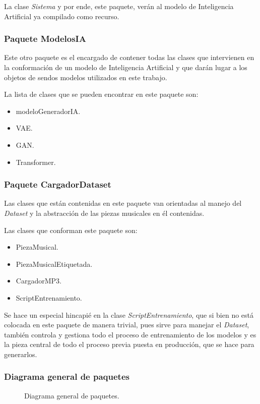 La clase \emph{Sistema} y por ende, este paquete, verán al modelo de Inteligencia Artificial ya compilado como recurso.

\subsubsection{Paquete ModelosIA}

Este otro paquete es el encargado de contener todas las clases que intervienen en la conformación de un modelo de Inteligencia Artificial y que darán lugar a los objetos de sendos modelos utilizados en este trabajo.

La lista de clases que se pueden encontrar en este paquete son:
\begin{itemize}
  \item modeloGeneradorIA.
  \item VAE.
  \item GAN.
  \item Transformer.
\end{itemize}


\subsubsection{Paquete CargadorDataset}

Las clases que están contenidas en este paquete van orientadas al manejo del \emph{Dataset} y la abstracción de las piezas musicales en él contenidas.

Las clases que conforman este paquete son:
\begin{itemize}
  \item PiezaMusical.
  \item PiezaMusicalEtiquetada.
  \item CargadorMP3.
  \item ScriptEntrenamiento.
\end{itemize}

Se hace un especial hincapié en la clase \emph{ScriptEntrenamiento}, que si bien no está colocada en este paquete de manera trivial, pues sirve para manejar el \emph{Dataset}, también controla y gestiona todo el proceso de entrenamiento de los modelos y es la pieza central de todo el proceso previa puesta en producción, que se hace para generarlos.


\subsubsection{Diagrama general de paquetes}

\begin{figure}[H]
  \centering
  
  \caption{Diagrama general de paquetes.}
\end{figure}
